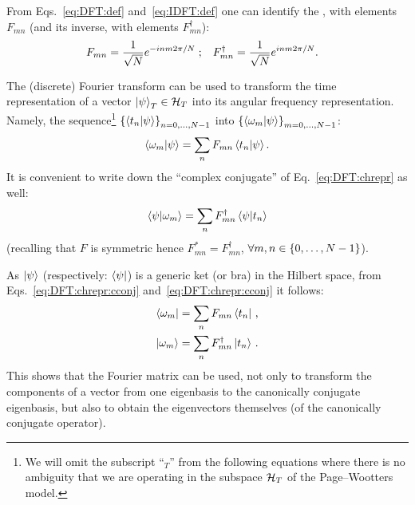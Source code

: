 From Eqs.~\eqref{eq:DFT:def} and~\eqref{eq:IDFT:def} one can identify the
, with elements $F_{mn}$
(and its inverse,
with elements $F_{mn}^{\dagger}$):
\begin{align}
  F_{mn}            &= \frac{1}{\sqrt{N}} e^{-i n m 2 \pi / N} \;\text{;} &
  F_{mn}^{\dagger}  &= \frac{1}{\sqrt{N}} e^{ i n m 2 \pi / N}
  \text{.}
\end{align}


The (discrete) Fourier transform can be used to transform the time representation
of a vector $\ket{\psi}_T \in \mathcal{H}_T$ into its angular frequency representation.
Namely, the sequence\footnote{
  We will omit the subscript ``${}_{T}$'' from the following equations
  where there is no ambiguity that
  we are operating in the subspace $\mathcal{H}_T$
  of the Page--Wootters model.
}
$\left\{\braket{t_n}{\psi}\right\}_{n=0, \dots, N-1}$ into
$\left\{\braket{\omega_m}{\psi}\right\}_{m=0, \dots, N-1}$:
\begin{equation}\label{eq:DFT:chrepr}  %
  \braket{\omega_{m}}{\psi} = \sum_n F_{mn} \braket{t_n}{\psi} \text{.}
\end{equation}
It is convenient to write down the ``complex conjugate'' of Eq.~\eqref{eq:DFT:chrepr} as well:
\begin{equation}\label{eq:DFT:chrepr:cconj}  %
  \braket{\psi}{\omega_{m}} = \sum_n F_{mn}^{\dagger} \braket{\psi}{t_n}
\end{equation}
(recalling that $F$ is symmetric hence
$F_{mn}^{*} = F_{mn}^{\dagger}$,
$\forall m,n \in \left\{0, \dots, N-1\right\}$).

As $\ket{\psi}$ (respectively: $\bra{\psi}$) is a generic ket (or bra) in the Hilbert space,
from Eqs.~\eqref{eq:DFT:chrepr:cconj} and~\eqref{eq:DFT:chrepr:cconj} it follows:
\begin{align}
  \label{eq:DFT:bra}  \bra{\omega_{m}} &= \sum_n F_{mn}           \bra{t_n} \,\text{,}  \\
  \label{eq:DFT:ket}  \ket{\omega_{m}} &= \sum_n F_{mn}^{\dagger} \ket{t_n} \,\text{.}
\end{align}
This shows that the Fourier matrix can be used, not only to transform the components
of a vector from one eigenbasis to the canonically conjugate eigenbasis,
but also to obtain the eigenvectors themselves (of the canonically conjugate operator).


